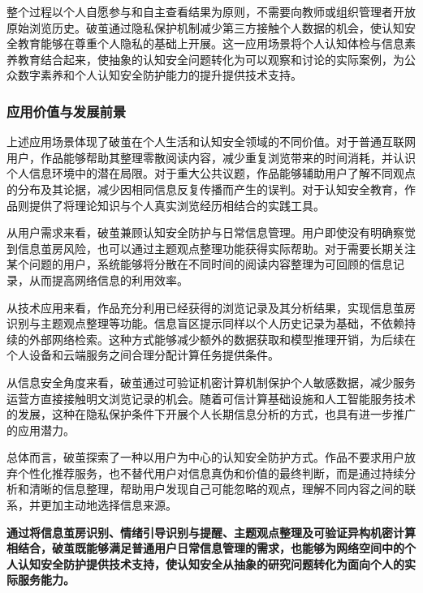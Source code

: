 整个过程以个人自愿参与和自主查看结果为原则，不需要向教师或组织管理者开放原始浏览历史。破茧通过隐私保护机制减少第三方接触个人数据的机会，使认知安全教育能够在尊重个人隐私的基础上开展。这一应用场景将个人认知体检与信息素养教育结合起来，使抽象的认知安全问题转化为可以观察和讨论的实际案例，为公众数字素养和个人认知安全防护能力的提升提供技术支持。

\subsubsection{应用价值与发展前景}\label{section:1.5.4}

上述应用场景体现了破茧在个人生活和认知安全领域的不同价值。对于普通互联网用户，作品能够帮助其整理零散阅读内容，减少重复浏览带来的时间消耗，并认识个人信息环境中的潜在局限。对于重大公共议题，作品能够辅助用户了解不同观点的分布及其论据，减少因相同信息反复传播而产生的误判。对于认知安全教育，作品则提供了将理论知识与个人真实浏览经历相结合的实践工具。

从用户需求来看，破茧兼顾认知安全防护与日常信息管理。用户即使没有明确察觉到信息茧房风险，也可以通过主题观点整理功能获得实际帮助。对于需要长期关注某个问题的用户，系统能够将分散在不同时间的阅读内容整理为可回顾的信息记录，从而提高网络信息的利用效率。

从技术应用来看，作品充分利用已经获得的浏览记录及其分析结果，实现信息茧房识别与主题观点整理等功能。信息盲区提示同样以个人历史记录为基础，不依赖持续的外部网络检索。这种方式能够减少额外的数据获取和模型推理开销，为后续在个人设备和云端服务之间合理分配计算任务提供条件。

从信息安全角度来看，破茧通过可验证机密计算机制保护个人敏感数据，减少服务运营方直接接触明文浏览记录的机会。随着可信计算基础设施和人工智能服务技术的发展，这种在隐私保护条件下开展个人长期信息分析的方式，也具有进一步推广的应用潜力。

总体而言，破茧探索了一种以用户为中心的认知安全防护方式。作品不要求用户放弃个性化推荐服务，也不替代用户对信息真伪和价值的最终判断，而是通过持续分析和清晰的信息整理，帮助用户发现自己可能忽略的观点，理解不同内容之间的联系，并更加主动地选择信息来源。

\textbf{通过将信息茧房识别、情绪引导识别与提醒、主题观点整理及可验证异构机密计算相结合，破茧既能够满足普通用户日常信息管理的需求，也能够为网络空间中的个人认知安全防护提供技术支持，使认知安全从抽象的研究问题转化为面向个人的实际服务能力。}
